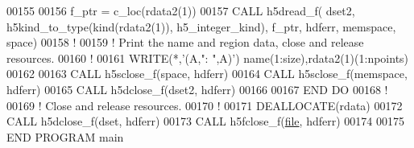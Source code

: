 \begin{DoxyCode}
00155 
00156      f\_ptr = c\_loc(rdata2(1))
00157      \textcolor{keyword}{CALL }h5dread\_f( dset2, h5kind\_to\_type(kind(rdata2(1)), h5\_integer\_kind), f\_ptr, hdferr, memspace, 
      space)
00158      \textcolor{comment}{!}
00159      \textcolor{comment}{! Print the name and region data, close and release resources.}
00160      \textcolor{comment}{!}
00161      \textcolor{keyword}{WRITE}(*,\textcolor{stringliteral}{'(A,": ",A)'}) name(1:size),rdata2(1)(1:npoints) 
00162 
00163      \textcolor{keyword}{CALL }h5sclose\_f(space, hdferr)
00164      \textcolor{keyword}{CALL }h5sclose\_f(memspace, hdferr)
00165      \textcolor{keyword}{CALL }h5dclose\_f(dset2, hdferr)
00166 
00167 \textcolor{keywordflow}{  END DO}
00168   \textcolor{comment}{!}
00169   \textcolor{comment}{! Close and release resources.}
00170   \textcolor{comment}{!}
00171   \textcolor{keyword}{DEALLOCATE}(rdata)
00172   \textcolor{keyword}{CALL }h5dclose\_f(dset, hdferr)
00173   \textcolor{keyword}{CALL }h5fclose\_f(\hyperlink{structfile}{file}, hdferr)
00174 
00175 \textcolor{keyword}{END PROGRAM }main
\end{DoxyCode}
